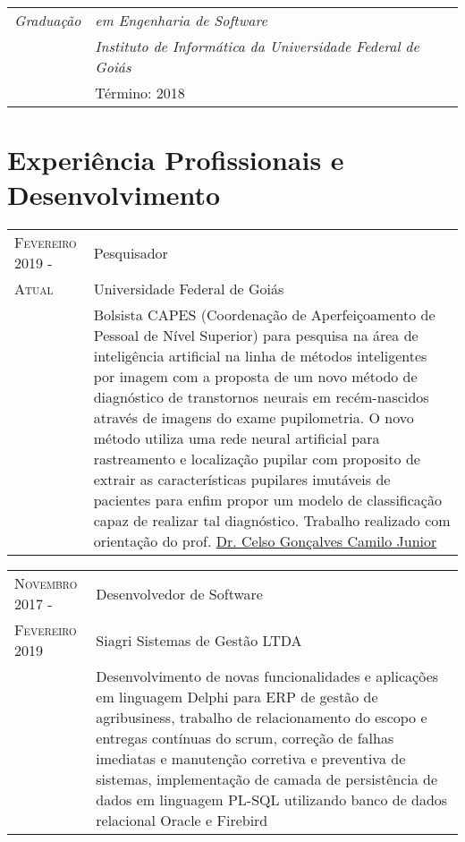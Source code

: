\documentclass[12pt, oneside, openany, a4paper, english, brazil]{abntex2}
\begin{document}
\begin{tabular}{p{2.2cm}|p{12cm}}
    \emph{Graduação}
    & \emph{em Engenharia de Software} \\
    & \emph{Instituto de Informática da Universidade Federal de Goiás} \\
    & Término: 2018\\
\end{tabular}


\section{Experiência Profissionais e Desenvolvimento}

\begin{tabular}{p{3.5cm}p{11cm}}
    \textsc{Fevereiro 2019} - & Pesquisador \\
    \textsc{Atual} & Universidade Federal de Goiás \\
    \textsc{} & Bolsista CAPES (Coordenação de Aperfeiçoamento de Pessoal de Nível Superior) para pesquisa na área de inteligência artificial na linha de métodos inteligentes por imagem com a proposta de um novo método de diagnóstico de transtornos neurais em recém-nascidos através de imagens do exame pupilometria. O novo método utiliza uma rede neural artificial para rastreamento e localização pupilar com proposito de extrair as características pupilares imutáveis de pacientes para enfim propor um modelo de classificação capaz de realizar tal diagnóstico. Trabalho realizado com orientação do prof. \href{http://lattes.cnpq.br/6776569904919279}{Dr. Celso Gonçalves Camilo Junior}
\end{tabular}

\begin{tabular}{p{3.5cm}p{11cm}}
    \textsc{Novembro 2017} - & Desenvolvedor de Software \\
    \textsc{Fevereiro 2019} & Siagri Sistemas de Gestão LTDA \\
    \textsc{} & Desenvolvimento de novas funcionalidades e aplicações em linguagem Delphi para ERP de gestão de agribusiness, trabalho de relacionamento do escopo e entregas contínuas do scrum, correção de falhas imediatas e manutenção corretiva e preventiva de sistemas, implementação de camada de persistência de dados em linguagem PL-SQL utilizando banco de dados relacional Oracle e Firebird
\end{tabular}
\end{document}
